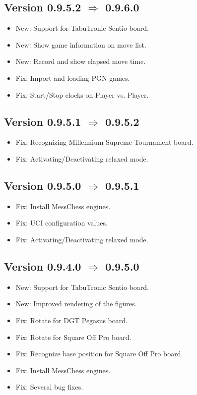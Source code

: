 \documentclass[11pt,a4paper]{article}
\begin{document}
\subsection*{Version 0.9.5.2 $\Rightarrow$  0.9.6.0}
\begin{itemize}
	\item {\color{blue}New}: Support for TabuTronic Sentio board.
	\item {\color{blue}New}: Show game information on move list.	
	\item {\color{blue}New}: Record and show elapsed move time.		
	\item {\color{red}Fix}: Import and loading PGN games.
	\item {\color{red}Fix}: Start/Stop clocks on Player vs. Player.	
\end{itemize}


\subsection*{Version 0.9.5.1 $\Rightarrow$  0.9.5.2}
\begin{itemize}
	\item {\color{red}Fix}: Recognizing Millennium Supreme Tournament board.
	\item {\color{red}Fix}: Activating/Deactivating relaxed mode.
\end{itemize}

\subsection*{Version 0.9.5.0 $\Rightarrow$  0.9.5.1}
\begin{itemize}
	\item {\color{red}Fix}: Install MessChess engines.
	\item {\color{red}Fix}: UCI configuration values.
	\item {\color{red}Fix}: Activating/Deactivating relaxed mode.
\end{itemize}

\subsection*{Version 0.9.4.0 $\Rightarrow$  0.9.5.0}
\begin{itemize}
	\item {\color{blue}New}: Support for TabuTronic Sentio board.
	\item {\color{blue}New}: Improved rendering of the figures.
    \item {\color{red}Fix}: Rotate for DGT Pegasus board.
    \item {\color{red}Fix}: Rotate for Square Off Pro board.    
    \item {\color{red}Fix}: Recognize base position for Square Off Pro board.        
	\item {\color{red}Fix}: Install MessChess engines.
	\item {\color{red}Fix}: Several bug fixes.
\end{itemize}
\end{document}
